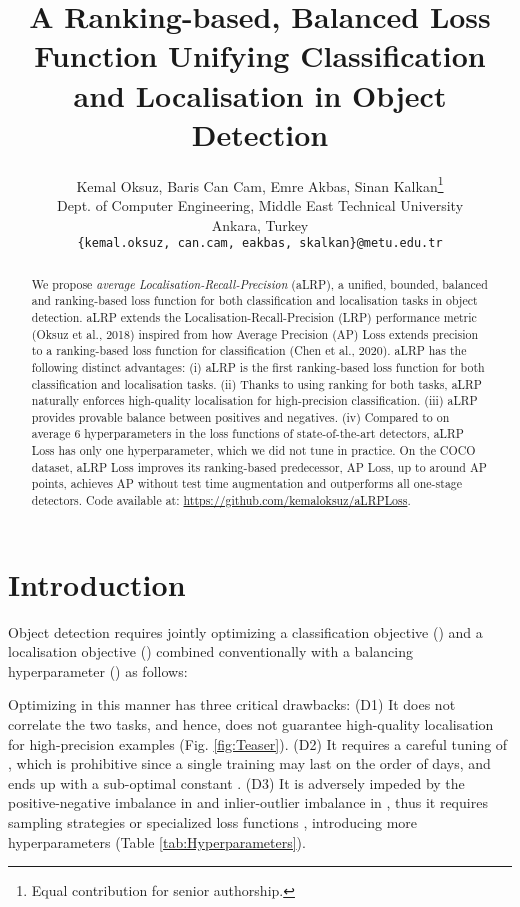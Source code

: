 \documentclass{article}
\title{A Ranking-based, Balanced Loss Function Unifying Classification and Localisation in Object Detection }
\author{Kemal Oksuz, Baris Can Cam, Emre Akbas, Sinan Kalkan\thanks{Equal contribution for senior authorship.}\\
  Dept. of Computer Engineering, Middle East Technical University\\
  Ankara, Turkey \\
  \texttt{\{kemal.oksuz, can.cam, eakbas, skalkan\}@metu.edu.tr} 
}
\begin{document}
\maketitle

\begin{abstract}
We propose \textit{average Localisation-Recall-Precision} (aLRP), a unified, bounded, balanced and ranking-based loss function for both classification and localisation tasks in object detection. aLRP extends the Localisation-Recall-Precision (LRP) performance metric (Oksuz et al., 2018) inspired from how Average Precision (AP) Loss extends precision to a ranking-based loss function for classification (Chen et al., 2020). aLRP has the following distinct advantages: (i) aLRP is the first ranking-based loss function for both classification and localisation tasks. (ii) Thanks to using ranking for both tasks, aLRP naturally enforces high-quality localisation for high-precision classification. (iii) aLRP provides provable balance between positives and negatives. (iv) Compared to on average 6 hyperparameters in the loss functions of state-of-the-art detectors, aLRP Loss has only one hyperparameter, which we did not tune in practice. On the COCO dataset, aLRP Loss improves its ranking-based predecessor, AP Loss, up to around  AP points, achieves  AP without test time augmentation and outperforms all one-stage detectors. Code available at: \url{https://github.com/kemaloksuz/aLRPLoss}.











\end{abstract}

\section{Introduction}
\label{sec:intro}
Object detection requires jointly optimizing a classification objective () and a localisation objective () combined conventionally with a balancing hyperparameter () as follows: 

Optimizing  in this manner has three critical drawbacks: (D1) It does not correlate the two tasks, and hence, does not guarantee high-quality localisation for high-precision examples (Fig. \ref{fig:Teaser}). (D2) It requires a careful tuning of  \cite{CenterNet,GIoULoss,FreeAnchor}, which is prohibitive since a single training may last on the order of days, and ends up with a sub-optimal constant  \cite{LapNet,WrLearningviaUncertainty}. (D3) It is adversely impeded by the positive-negative imbalance in  and inlier-outlier imbalance in , thus it requires sampling strategies \cite{gradientharmonizing, FocalLoss} or specialized loss functions \cite{FastRCNN, LibraRCNN}, introducing more hyperparameters (Table \ref{tab:Hyperparameters}). 
\end{document}
